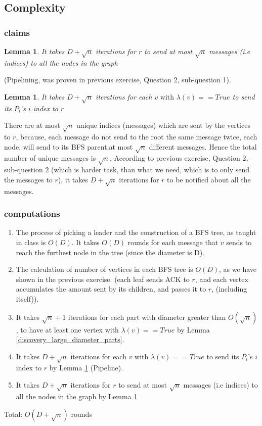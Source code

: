 \documentclass[11pt]{article}
\newtheorem{lemma}[theorem]{Lemma}
\begin{document}
\subsection*{Complexity}

\subsubsection*{claims}

\begin{lemma}
\label{root_brodcast_pipeline}
 It takes $D + \sqrt{n}$ iterations for $r$ to send at most $\sqrt{n}$ messages (i.e indices) to all the nodes in the graph
\end{lemma}
(Pipelining, was proven in previous exercise, Question 2, sub-question 1).

\begin{lemma}
\label{vertex_sends_root}
 It takes $D + \sqrt{n}$ iterations for each $v \text{ with } \lambda(v) == True$ to send its $P_i$'s $i$ index to $r$
\end{lemma}
There are at most $\sqrt{n}$ unique indices (messages) which are sent by the vertices to $r$, because, each message do not send to the root the same message twice, each node, will send to its BFS parent,at most $\sqrt{n}$ different messages. Hence the total number of unique messages is $\sqrt{n}$, According to previous exercise, Question 2, sub-question 2 (which is harder task, than what we need, which is to only send the messages to $r$), it takes $D + \sqrt{n}$ iterations for $r$ to be notified about all the messages.


\subsubsection*{computations}

\begin{enumerate}
    \item The process of picking a leader and the construction of a BFS tree, as taught in class is $O(D)$. It takes $O(D)$ rounds for each message that $v$ sends to reach the furthest node in the tree (since the diameter is D). 
    \item The calculation of number of vertices in each BFS tree is $O(D)$, as we have shown in the previous exercise. (each leaf sends ACK to $r$, and each vertex accumulates the amount sent by its children, and passes it to $r$, (including itself)).
   \item It takes $\sqrt{n} +1$ iterations for each part with diameter greater than $O(\sqrt{n})$, to have at least one vertex with $\lambda(v) == True$ by Lemma \ref{discovery_large_diameter_parts}.
   \item It takes $D + \sqrt{n}$ iterations for each $v \text{ with } \lambda(v) == True$ to send its $P_i$'s $i$ index to $r$ by Lemma \ref{vertex_sends_root} (Pipeline).
   \item It takes $D + \sqrt{n}$ iterations for $r$ to send at most $\sqrt{n}$ messages (i.e indices) to all the nodes in the graph by Lemma \ref{root_brodcast_pipeline}
\end{enumerate}
Total: $O(D + \sqrt{n})$ rounds
\end{document}
